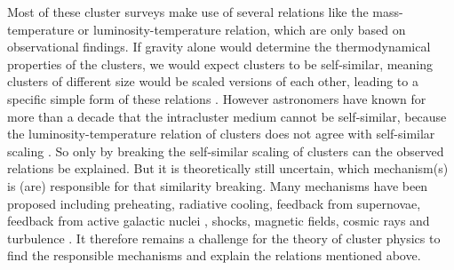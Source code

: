 Most of these cluster surveys make use of several
relations like the mass-temper\-ature or luminosity-temperature relation, which
are only based on observational findings. If gravity alone would determine
the thermodynamical properties of the clusters, we would expect clusters to be
self-similar, meaning clusters of different size would be scaled versions of
each other, leading to a specific simple form of these relations
\citep{Kaiser1986}.
However astronomers have known for more than a decade that the intracluster
medium cannot be self-similar, because the luminosity-temperature
relation of clusters does not agree with self-similar scaling \citep{Voit2005}.
So only by breaking the self-similar scaling of clusters can the
observed relations be explained. But it is theoretically
still uncertain, which mechanism(s) is (are) responsible for that similarity
breaking. Many mechanisms have been proposed including preheating, radiative
cooling, feedback from supernovae, feedback from active galactic nuclei
\citep{Voit2005}, shocks, magnetic fields, cosmic rays and turbulence 
\citep{Dolag2008}. It therefore remains a challenge for the theory of cluster
physics to find the responsible mechanisms and explain the relations mentioned
above.

